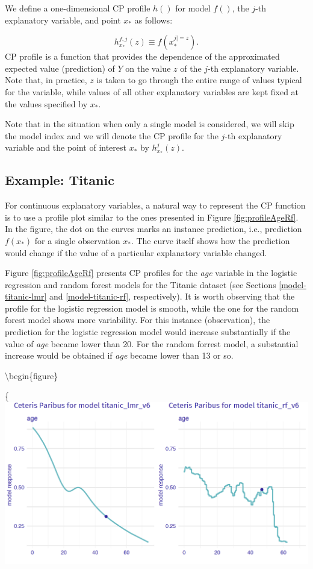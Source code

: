 \documentclass[12pt,]{krantz}
\begin{document}
We define a one-dimensional CP profile \(h()\) for model \(f()\), the \(j\)-th explanatory variable, and point \(x_*\) as follows:

\[
h^{f,j}_{x_*}(z) \equiv f(x_*^{j|=z}).
\]
CP profile is a function that provides the dependence of the approximated expected value (prediction) of \(Y\) on the value \(z\) of the \(j\)-th explanatory variable. Note that, in practice, \(z\) is taken to go through the entire range of values typical for the variable, while values of all other explanatory variables are kept fixed at the values specified by \(x_*\).

Note that in the situation when only a single model is considered, we will skip the model index and we will denote the CP profile for the \(j\)-th explanatory variable and the point of interest \(x_*\) by \(h^{j}_{x_*}(z)\).

\hypertarget{CPExample}{%
\subsection{Example: Titanic}\label{CPExample}}

For continuous explanatory variables, a natural way to represent the CP function is to use a profile plot similar to the ones presented in Figure \ref{fig:profileAgeRf}. In the figure, the dot on the curves marks an instance prediction, i.e., prediction \(f(x_*)\) for a single observation \(x_*\). The curve itself shows how the prediction would change if the value of a particular explanatory variable changed.

Figure \ref{fig:profileAgeRf} presents CP profiles for the \emph{age} variable in the logistic regression and random forest models for the Titanic dataset (see Sections \ref{model-titanic-lmr} and \ref{model-titanic-rf}, respectively). It is worth observing that the profile for the logistic regression model is smooth, while the one for the random forest model shows more variability. For this instance (observation), the prediction for the logistic regression model would increase substantially if the value of \emph{age} became lower than 20. For the random forrest model, a substantial increase would be obtained if \emph{age} became lower than 13 or so.

\textbackslash{}begin\{figure\}

\{\centering \includegraphics[width=0.7\linewidth]{figure/profile_age_rf}
\end{document}
